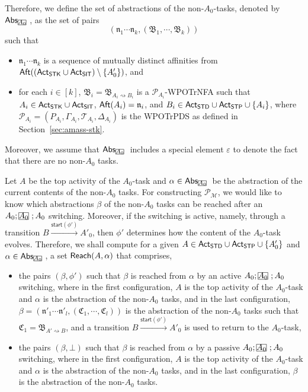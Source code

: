 \documentclass[preprint,12pt]{elsarticle}
\newcommand\rectangled[1]{\tikz[baseline=(torect.base)]{
    \node[shape = rectangle, draw, inner sep=0pt, outer sep = 0pt] (torect) {#1}
    }
}
\newcommand{\mrectangled}[1]{\text{\rectangled{\ensuremath{#1}}}}
\newcommand{\mhcancel}[1]{\mrectangled{#1}}
\newcommand\Mm{{\mathcal{M} }}
\newcommand\Pp{{\mathcal{P} }}
\newcommand\act{{\sf Act}}
\newcommand\aft{{\sf Aft}}
\newcommand\standard{{\sf STD}}
\newcommand\singletop{{\sf STP}}
\newcommand\singletask{{\sf STK}}
\newcommand\singleinstance{{\sf SIT}}
\newcommand\startactivity{{\mathsf{start} }}
\newcommand\abs{{\mathsf{Abs} }}
\newcommand\aname{\mathfrak{n}}
\newcommand\reach{{\sf Reach}}
\newcommand\AutB{{\mathfrak{B} }}
\newcommand\AutC{{\mathfrak{C} }}
\newcommand\TranSet{{\mathscr{T} }}
\newcommand{\WOTrPDS}{\textsf{WPOTrPDS}}
\newcommand{\WOTrNFA}{\textsf{WPOTrNFA}}
\begin{document}
Therefore, we define the set of abstractions of the non-$A_0$-tasks, denoted by $\abs_{\mhcancel{A_0}}$, as the set of pairs 
\[(\aname_1 \cdots \aname_k, (\AutB_1, \cdots, \AutB_k))\]
such that 
\begin{itemize}
\item $\aname_1 \cdots \aname_k$ is a sequence of mutually distinct affinities from $\aft((\act_{\singletask} \cup \act_{\singleinstance}) \setminus \{A'_0\})$, and 
%
\item for each $i \in [k]$, $\AutB_i = \AutB_{A_i \rightsquigarrow B_i}$ is a $\Pp_{A_i}$-{\WOTrNFA} such that $A_i \in \act_\singletask \cup \act_\singleinstance$, $\aft(A_i) = \aname_i$, and $B_i \in \act_\standard \cup \act_\singletop \cup \{A_i\}$, where $\Pp_{A_i} = (P_{A_i}, \Gamma_{A_i}, \TranSet_{A_i}, \Delta_{A_i})$ is the {\WOTrPDS} as defined in Section~\ref{sec:amass-stk}. 
\end{itemize}
Moreover, we assume that $\abs_{\mhcancel{A_0}}$ includes a special element $\varepsilon$ to denote the fact that there are no non-$A_0$ tasks. 

Let $A$ be the top activity of the $A_0$-task and $\alpha \in \abs_{\mhcancel{A_0}}$ be the abstraction of the current contents of the non-$A_0$ tasks. For constructing $\Pp_{\Mm}$, we would like to know which abstractions $\beta$ of the non-$A_0$ tasks can be reached after an $A_0;\mhcancel{A_0};A_0$ switching. Moreover, if the switching is active, namely, through a transition $B \xrightarrow{\startactivity(\phi')} A'_0$, then $\phi'$ determines how the content of the $A_0$-task evolves. Therefore, we shall compute for a given $A \in \act_\standard \cup \act_\singletop \cup \{A'_0\}$ and $\alpha \in \abs_{\mhcancel{A_0}}$, a set $\reach(A, \alpha)$ that comprises, 
\begin{itemize}
\item the pairs $(\beta, \phi')$ such that $\beta$ is reached from $\alpha$ by an active $A_0;\mhcancel{A_0};A_0$ switching, where in the first configuration, $A$ is the top activity of the $A_0$-task and $\alpha$ is the abstraction of the non-$A_0$ tasks, and in the last configuration, $\beta = (\aname'_1\cdots \aname'_l, (\AutC_1, \cdots, \AutC_l))$ is the abstraction of the non-$A_0$ tasks such that $\AutC_1 = \AutB_{A' \rightsquigarrow B}$, and a transition $B \xrightarrow{\startactivity(\phi')} A'_0$ is used to return to the $A_0$-task,  
%
\item the pairs $(\beta, \bot)$ such that $\beta$ is reached from $\alpha$ by a passive $A_0;\mhcancel{A_0};A_0$ switching, where in the first configuration, $A$ is the top activity of the $A_0$-task and $\alpha$ is the abstraction of the non-$A_0$ tasks, and in the last configuration, $\beta$ is the abstraction of the non-$A_0$ tasks. 
\end{itemize}
\end{document}
